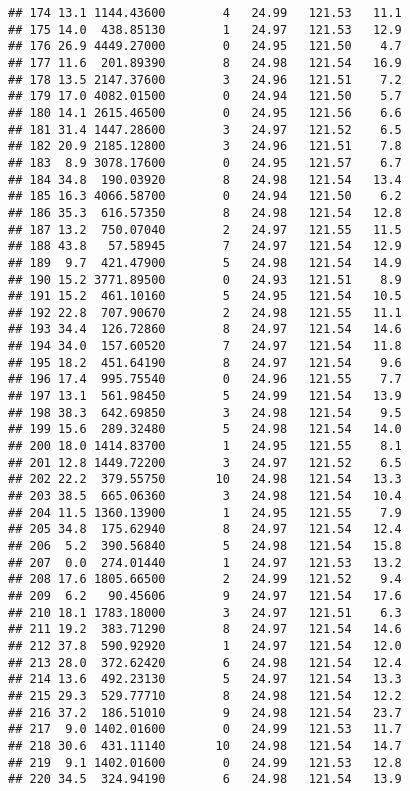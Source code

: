 \documentclass[
]{article}
\begin{document}
\begin{verbatim}
## 174 13.1 1144.43600        4   24.99   121.53   11.1
## 175 14.0  438.85130        1   24.97   121.53   12.9
## 176 26.9 4449.27000        0   24.95   121.50    4.7
## 177 11.6  201.89390        8   24.98   121.54   16.9
## 178 13.5 2147.37600        3   24.96   121.51    7.2
## 179 17.0 4082.01500        0   24.94   121.50    5.7
## 180 14.1 2615.46500        0   24.95   121.56    6.6
## 181 31.4 1447.28600        3   24.97   121.52    6.5
## 182 20.9 2185.12800        3   24.96   121.51    7.8
## 183  8.9 3078.17600        0   24.95   121.57    6.7
## 184 34.8  190.03920        8   24.98   121.54   13.4
## 185 16.3 4066.58700        0   24.94   121.50    6.2
## 186 35.3  616.57350        8   24.98   121.54   12.8
## 187 13.2  750.07040        2   24.97   121.55   11.5
## 188 43.8   57.58945        7   24.97   121.54   12.9
## 189  9.7  421.47900        5   24.98   121.54   14.9
## 190 15.2 3771.89500        0   24.93   121.51    8.9
## 191 15.2  461.10160        5   24.95   121.54   10.5
## 192 22.8  707.90670        2   24.98   121.55   11.1
## 193 34.4  126.72860        8   24.97   121.54   14.6
## 194 34.0  157.60520        7   24.97   121.54   11.8
## 195 18.2  451.64190        8   24.97   121.54    9.6
## 196 17.4  995.75540        0   24.96   121.55    7.7
## 197 13.1  561.98450        5   24.99   121.54   13.9
## 198 38.3  642.69850        3   24.98   121.54    9.5
## 199 15.6  289.32480        5   24.98   121.54   14.0
## 200 18.0 1414.83700        1   24.95   121.55    8.1
## 201 12.8 1449.72200        3   24.97   121.52    6.5
## 202 22.2  379.55750       10   24.98   121.54   13.3
## 203 38.5  665.06360        3   24.98   121.54   10.4
## 204 11.5 1360.13900        1   24.95   121.55    7.9
## 205 34.8  175.62940        8   24.97   121.54   12.4
## 206  5.2  390.56840        5   24.98   121.54   15.8
## 207  0.0  274.01440        1   24.97   121.53   13.2
## 208 17.6 1805.66500        2   24.99   121.52    9.4
## 209  6.2   90.45606        9   24.97   121.54   17.6
## 210 18.1 1783.18000        3   24.97   121.51    6.3
## 211 19.2  383.71290        8   24.97   121.54   14.6
## 212 37.8  590.92920        1   24.97   121.54   12.0
## 213 28.0  372.62420        6   24.98   121.54   12.4
## 214 13.6  492.23130        5   24.97   121.54   13.3
## 215 29.3  529.77710        8   24.98   121.54   12.2
## 216 37.2  186.51010        9   24.98   121.54   23.7
## 217  9.0 1402.01600        0   24.99   121.53   11.7
## 218 30.6  431.11140       10   24.98   121.54   14.7
## 219  9.1 1402.01600        0   24.99   121.53   12.8
## 220 34.5  324.94190        6   24.98   121.54   13.9

\end{verbatim}
\end{document}
